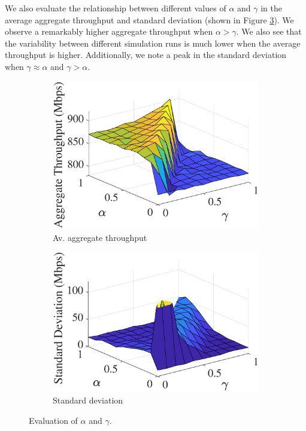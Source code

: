 \documentclass{article}
\begin{document}
	We also evaluate the relationship between different values of $\alpha$ and $\gamma$ in the average aggregate throughput and standard deviation (shown in Figure \ref{fig:ql_alpha_vs_gamma}). We observe a remarkably higher aggregate throughput when $\alpha > \gamma$. We also see that the variability between different simulation runs is much lower when the average throughput is higher. Additionally, we note a peak in the standard deviation when $\gamma \approx \alpha$ and $\gamma > \alpha$. 	
	\begin{figure}[t!]
		\centering
		\begin{subfigure}[(a)]{0.32\textwidth}
			\includegraphics[width=\textwidth]{images/alpha_vs_gamma_avg_tpt_sqrt_epsilon}
			\caption{Av. aggregate throughput}
			\label{fig:alpha_vs_gamma_avg_tpt_sqrt_epsilon}
		\end{subfigure}
		\begin{subfigure}[(b)]{0.32\textwidth}
			\includegraphics[width=\textwidth]{images/alpha_vs_gamma_std_sqrt_epsilon}
			\caption{Standard deviation}
			\label{fig:alpha_vs_gamma_std_sqrt_epsilon}
		\end{subfigure}
		\caption{Evaluation of $\alpha$ and $\gamma$.}
		\label{fig:ql_alpha_vs_gamma}
	\end{figure}	
	
\end{document}
